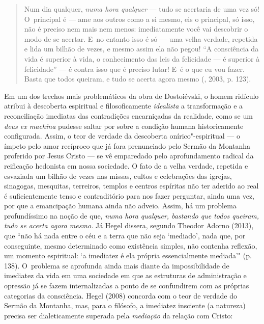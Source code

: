\begin{quote}
Num dia qualquer, \emph{numa hora qualquer} --- tudo se acertaria de uma
vez só! O~principal é --- ame aos outros como a si mesmo, eis o
principal, só isso, não é preciso nem mais nem menos: imediatamente você
vai descobrir o modo de se acertar. E~no entanto isso é só --- uma velha
verdade, repetida e lida um bilhão de vezes, e mesmo assim ela não
pegou! ``A consciência da vida é superior à vida, o conhecimento das
leis da felicidade --- é superior à felicidade'' --- é contra isso que é
preciso lutar! E~é o que eu vou fazer. Basta que todos queiram, e tudo
se acerta agora mesmo (, 2003, p. 123).
\end{quote}

Em um dos trechos mais problemáticos da obra de Dostoiévski, o homem
ridículo atribui à descoberta espiritual e filosoficamente
\emph{idealista} a transformação e a reconciliação imediatas das
contradições encarniçadas da realidade, como se um \emph{deus ex
machina} pudesse saltar por sobre a condição humana historicamente
configurada. Assim, o teor de verdade da descoberta onírico"-espiritual
--- o ímpeto pelo amor recíproco que já fora prenunciado pelo Sermão da
Montanha proferido por Jesus Cristo --- se vê emparedado pelo
aprofundamento radical da reificação hedonista em nossa sociedade. O
fato de a velha verdade, repetida e esvaziada um bilhão de vezes nas
missas, cultos e celebrações das igrejas, sinagogas, mesquitas,
terreiros, templos e centros espíritas não ter aderido ao real é
suficientemente tenso e contraditório para nos fazer perguntar, ainda
uma vez, por que a emancipação humana ainda não adveio. Assim, há um
problema profundíssimo na noção de que, \emph{numa hora qualquer,
bastando que todos queiram, tudo se acerta agora mesmo.} Já Hegel
dissera, segundo Theodor Adorno (2013), que ``não há nada entre o céu e
a terra que não seja `mediado', nada que, por conseguinte, mesmo
determinado como existência simples, não contenha reflexão, um momento
espiritual: `a imediatez é ela própria essencialmente mediada'" (p.
138). O~problema se aprofunda ainda mais diante da impossibilidade de
imediatez da vida em uma sociedade em que as estruturas de administração
e opressão já se fazem internalizadas a ponto de se confundirem com as
próprias categorias da consciência. Hegel (2008) concorda com o teor de
verdade do Sermão da Montanha, mas, para o filósofo, a imediatez
insciente (a natureza) precisa ser dialeticamente superada pela
\emph{mediação} da relação com Cristo:

